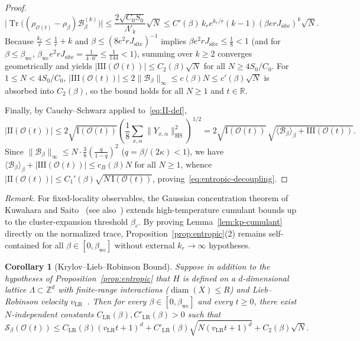 \documentclass[11pt,a4paper]{article}
\numberwithin{equation}{section}
\theoremstyle{plain}
\newtheorem{corollary}[theorem]{Corollary}
\theoremstyle{definition}
\newcommand{\HS}{\mathrm{HS}}
\newcommand{\Tr}{\operatorname{Tr}}
\newcommand{\diam}{\operatorname{diam}}
\begin{document}
\begin{proof}
\[
  \bigl|\Tr\!\bigl((\rho_{\mathcal{O}(t)}-\rho_\beta)\mathcal{B}_\beta^{(k)}\bigr)\bigr|
  \le \frac{2\sqrt{C_0 S_0}}{\Lambda'_k}\sqrt{N}
  \le C'(\beta)\,k_r e^{k_r/r}(k-1)(\beta e r J_{\mathrm{site}})^k\sqrt{N}.
\]
Because $\frac{k_r}{r} \le \frac{1}{r} + k$ and $\beta\le (8e^2 r J_{\mathrm{site}})^{-1}$ implies $\beta e^2 r J_{\mathrm{site}} \le \frac{1}{8} < 1$ (and for $\beta\le\beta_{\mathrm{wc}}$, $\beta_{\mathrm{wc}} e^2 r J_{\mathrm{site}} = \frac{1}{4\cdot 6^r} \le \frac{1}{144} < 1$), summing over $k\ge 2$ converges geometrically and yields $|\mathrm{III}(\mathcal{O}(t))| \le C_2(\beta)\sqrt{N}$ for all $N\ge 4S_0/C_0$. For $1\le N < 4S_0/C_0$, $|\mathrm{III}(\mathcal{O}(t))|\le 2\|\mathcal{B}_\beta\|_\infty \le c(\beta)N \le c'(\beta)\sqrt{N}$ is absorbed into $C_2(\beta)$, so the bound holds for all $N\ge 1$ and $t\in\mathbb{R}$.

Finally, by Cauchy--Schwarz applied to~\eqref{eq:II-def},
\[
  |\mathrm{II}(\mathcal{O}(t))|
  \le 2\sqrt{\mathrm{I}(\mathcal{O}(t))}\left(\frac{1}{8}\sum_{x,\alpha}\|Y_{x,\alpha}\|_\HS^2\right)^{1/2}
  = 2\sqrt{\mathrm{I}(\mathcal{O}(t))}\,\sqrt{\langle\mathcal{B}_\beta\rangle_\beta + \mathrm{III}(\mathcal{O}(t))}.
\]
Since $\|\mathcal{B}_\beta\|_\infty \le N\cdot\frac{3}{8}(\frac{q}{1-q})^2$ ($q=\beta/(2\kappa)<1$), we have $\langle\mathcal{B}_\beta\rangle_\beta + |\mathrm{III}(\mathcal{O}(t))| \le c_B(\beta) N$ for all $N\ge 1$, whence $|\mathrm{II}(\mathcal{O}(t))| \le C_1'(\beta)\sqrt{N\,\mathrm{I}(\mathcal{O}(t))}$, proving~\eqref{eq:entropic-decoupling}.
\end{proof}

\noindent\emph{Remark.}
For fixed-locality observables, the Gaussian concentration theorem of Kuwahara and Saito~\cite{Kuwahara2020a} (see also~\cite{Anshu2021}) extends high-temperature cumulant bounds up to the cluster-expansion threshold $\beta_c$. By proving Lemma~\ref{lem:kp-cumulant} directly on the normalized trace, Proposition~\ref{prop:entropic}(2) remains self-contained for all $\beta\in[0,\beta_{\mathrm{wc}}]$ without external $k_r\to\infty$ hypotheses.

\begin{corollary}[Krylov--Lieb--Robinson Bound]\label{cor:klr}
Suppose in addition to the hypotheses of Proposition~\ref{prop:entropic} that $H$ is defined on a $d$-dimensional lattice $\Lambda\subset\mathbb{Z}^d$ with finite-range interactions ($\diam(X)\le R$) and Lieb--Robinson velocity $v_{\mathrm{LR}}$~\cite{Lieb1972,Hastings2006,Nachtergaele2006}. Then for every $\beta\in[0,\beta_{\mathrm{wc}}]$ and every $t\ge 0$, there exist $N$-independent constants $C_{\mathrm{LR}}(\beta), C'_{\mathrm{LR}}(\beta) > 0$ such that
\begin{equation}\label{eq:klr-bound}
  \mathcal{S}_\beta(\mathcal{O}(t))
  \le C_{\mathrm{LR}}(\beta)(v_{\mathrm{LR}}t + 1)^d
    + C'_{\mathrm{LR}}(\beta)\sqrt{N(v_{\mathrm{LR}}t + 1)^d}
    + C_2(\beta)\sqrt{N}.
\end{equation}
\end{corollary}
\end{document}
